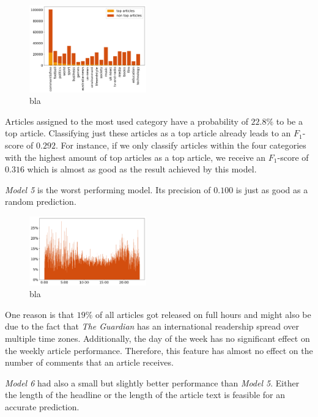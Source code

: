 \begin{figure}
	\includegraphics[width=0.45\textwidth]{fig/top_ten_category.png}
	\caption{\textmd{bla }}
	\label{fig:top_ten_category}
\end{figure}

Articles assigned to the most used category have a probability of $22.8\%$ to be a top article. Classifying just these articles as a top article already leads to an $F_1$-score of $0.292$. 
For instance, if we only classify articles within the four categories with the highest amount of top articles as a top article, we receive an $F_1$-score of $0.316$ which is almost as good as the result achieved by this model.

\textit{Model 5} is the worst performing model. Its precision of $0.100$ is just as good as a random prediction.

\begin{figure}
	\includegraphics[width=0.45\textwidth]{fig/top_ten_time.png}
	\caption{\textmd{bla }}
	\label{fig:top_ten_time}
\end{figure}

One reason is that $19\%$ of all articles got released on full hours and might also be due to the fact that \textit{The Guardian} has an international readership spread over multiple time zones. Additionally, the day of the week has no significant effect on the weekly article performance. Therefore, this feature has almost no effect on the number of comments that an article receives. 

\textit{Model 6} had also a small but slightly better performance than \textit{Model 5}. 
Either the length of the headline or the length of the article text is feasible for an accurate prediction.

